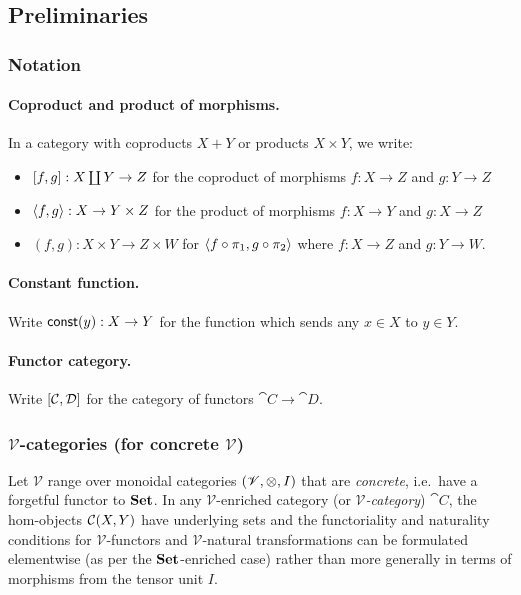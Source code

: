\subsection{Preliminaries}

\subsubsection{Notation}

\paragraph{Coproduct and product of morphisms.} In a category with coproducts $X + Y$ or products $X \times
Y$, we write:
\begin{itemize}
\item $[f, g]: X \coprod Y \to Z$ for the coproduct of morphisms $f: X \to Z$ and $g: Y \to Z$
\item $\langle f, g\rangle: X \to Y \times Z$ for the product of morphisms $f: X \to Y$ and $g: X \to Z$
\item $(f,g): X \times Y \to Z \times W$ for $\langle f \circ \pi_1, g \circ \pi_2\rangle$ where $f: X \to Z$ and $g: Y \to W$.
\end{itemize}

\paragraph{Constant function.} Write $\mathsf{const}(y): X \to Y$ for the function which sends any $x \in X$ to $y \in
Y$.

\paragraph{Functor category.} Write $[\mathcal{C},\mathcal{D}]$ for the category of functors $\cat{C} \to
\cat{D}$.

\subsubsection{$\mathscr{V}$-categories (for concrete $\mathscr{V}$)}

Let $\mathscr{V}$ range over monoidal categories $(\mathscr{V}, \otimes, I)$ that are \emph{concrete},
i.e.~have a forgetful functor to $\mathbf{Set}$. In any $\mathscr{V}$-enriched category (or
\emph{$\mathscr{V}$-category}) $\cat{C}$, the hom-objects ${\mathcal{C}}(X,Y)$ have underlying sets and the
functoriality and naturality conditions for $\mathscr{V}$-functors and $\mathscr{V}$-natural transformations
can be formulated elementwise (as per the $\mathbf{Set}$-enriched case) rather than more generally in terms of
morphisms from the tensor unit $I$. 

